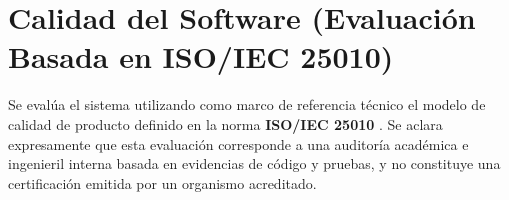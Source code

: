 \documentclass[12pt,a4paper]{article}
\begin{document}
\section{Calidad del Software (Evaluaci\'on Basada en ISO/IEC 25010)}

Se eval\'ua el sistema utilizando como marco de referencia t\'ecnico el modelo de calidad de producto definido en la norma \textbf{ISO/IEC 25010} \cite{iso25010}. Se aclara expresamente que esta evaluaci\'on corresponde a una auditor\'ia acad\'emica e ingenieril interna basada en evidencias de c\'odigo y pruebas, y no constituye una certificaci\'on emitida por un organismo acreditado.
\end{document}
